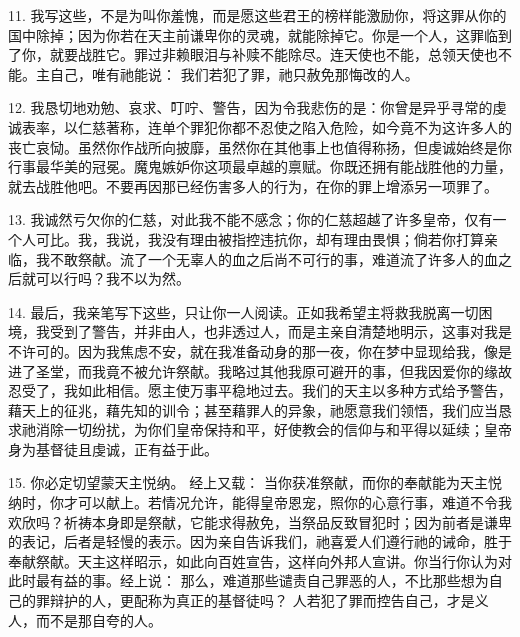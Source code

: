 11. 我写这些，不是为叫你羞愧，而是愿这些君王的榜样能激励你，将这罪从你的国中除掉；因为你若在天主前谦卑你的灵魂，就能除掉它。你是一个人，这罪临到了你，就要战胜它。罪过非赖眼泪与补赎不能除尽。连天使也不能，总领天使也不能。主自己，唯有祂能说：  我们若犯了罪，祂只赦免那悔改的人。\par

12. 我恳切地劝勉、哀求、叮咛、警告，因为令我悲伤的是：你曾是异乎寻常的虔诚表率，以仁慈著称，连单个罪犯你都不忍使之陷入危险，如今竟不为这许多人的丧亡哀恸。虽然你作战所向披靡，虽然你在其他事上也值得称扬，但虔诚始终是你行事最华美的冠冕。魔鬼嫉妒你这项最卓越的禀赋。你既还拥有能战胜他的力量，就去战胜他吧。不要再因那已经伤害多人的行为，在你的罪上增添另一项罪了。\par

13. 我诚然亏欠你的仁慈，对此我不能不感念；你的仁慈超越了许多皇帝，仅有一个人可比。我，我说，我没有理由被指控违抗你，却有理由畏惧；倘若你打算亲临，我不敢祭献。流了一个无辜人的血之后尚不可行的事，难道流了许多人的血之后就可以行吗？我不以为然。\par

14. 最后，我亲笔写下这些，只让你一人阅读。正如我希望主将救我脱离一切困境，我受到了警告，并非由人，也非透过人，而是主亲自清楚地明示，这事对我是不许可的。因为我焦虑不安，就在我准备动身的那一夜，你在梦中显现给我，像是进了圣堂，而我竟不被允许祭献。我略过其他我原可避开的事，但我因爱你的缘故忍受了，我如此相信。愿主使万事平稳地过去。我们的天主以多种方式给予警告，藉天上的征兆，藉先知的训令；甚至藉罪人的异象，祂愿意我们领悟，我们应当恳求祂消除一切纷扰，为你们皇帝保持和平，好使教会的信仰与和平得以延续；皇帝身为基督徒且虔诚，正有益于此。\par

15. 你必定切望蒙天主悦纳。  经上又载：  当你获准祭献，而你的奉献能为天主悦纳时，你才可以献上。若情况允许，能得皇帝恩宠，照你的心意行事，难道不令我欢欣吗？祈祷本身即是祭献，它能求得赦免，当祭品反致冒犯时；因为前者是谦卑的表记，后者是轻慢的表示。因为亲自告诉我们，祂喜爱人们遵行祂的诫命，胜于奉献祭献。天主这样昭示，如此向百姓宣告，这样向外邦人宣讲。你当行你认为对此时最有益的事。经上说：  那么，难道那些谴责自己罪恶的人，不比那些想为自己的罪辩护的人，更配称为真正的基督徒吗？ 人若犯了罪而控告自己，才是义人，而不是那自夸的人。\par

